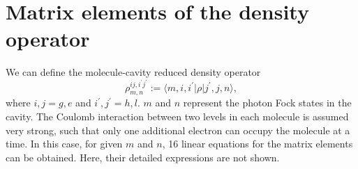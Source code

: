 \documentclass[aps,prb,
superscriptaddress,
,floatfix,footinbib,longbibliography,
preprint
]{revtex4-2}
\begin{document}
\section{Matrix elements of the density operator}
\label{matrix}

We can define the molecule-cavity reduced density operator
\begin{equation}
\rho_{m,n}^{ij,i^{\prime}j^{\prime}}:=\langle m,i,i^{\prime}|\rho|j^{\prime},j,n \rangle,
\end{equation}
where $i,j=g,e$ and $i^{\prime},j^{\prime}=h,l$. $m$ and $n$ represent the photon Fock states in the cavity. The Coulomb interaction
between two levels in each molecule is assumed very strong, such that only one additional electron can
 occupy the molecule at a time. In this case, for given $m$ and $n$, 16 linear equations for the matrix elements can be obtained. Here, their detailed expressions are not shown.

 \iffalse
 
\end{document}
